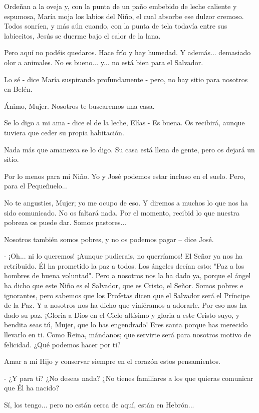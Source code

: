 \documentclass[12pt]{book} %
\begin{document}
Ordeñan a la oveja y, con la punta de un paño embebido de leche caliente y espumosa, María moja los labios del Niño, el cual absorbe ese dulzor cremoso. Todos sonríen, y más aún cuando, con la punta de tela todavía entre sus labiecitos, Jesús se duerme bajo el calor de la lana. 

Pero aquí no podéis quedaros. Hace frío y hay humedad. Y además... demasiado olor a animales. No es bueno... y... no está bien para el Salvador. 

Lo sé - dice María suspirando profundamente - pero, no hay sitio para nosotros en Belén. 

Ánimo, Mujer. Nosotros te buscaremos una casa. 

Se lo digo a mi ama - dice el de la leche, Elías - Es buena. Os recibirá, aunque tuviera que ceder su propia habitación. 

Nada más que amanezca se lo digo. Su casa está llena de gente, pero os dejará un sitio. 

Por lo menos para mi Niño. Yo y José podemos estar incluso en el suelo. Pero, para el Pequeñuelo... 

No te angusties, Mujer; yo me ocupo de eso. Y diremos a muchos lo que nos ha sido comunicado. No os faltará nada. Por el momento, recibid lo que nuestra pobreza os puede dar. Somos pastores... 

Nosotros también somos pobres, y no os podemos pagar – dice José. 

- ¡Oh... ni lo queremos! ¡Aunque pudierais, no querríamos! El Señor ya nos ha retribuido. Él ha prometido la paz a todos. Los ángeles decían esto: "Paz a los hombres de buena voluntad". Pero a nosotros nos la ha dado ya, porque el ángel ha dicho que este Niño es el Salvador, que es Cristo, el Señor. Somos pobres e ignorantes, pero sabemos que los Profetas dicen que el Salvador será el Príncipe de la Paz. Y a nosotros nos ha dicho que viniéramos a adorarle. Por eso nos ha dado su paz. ¡Gloria a Dios en el Cielo altísimo y gloria a este Cristo suyo, y bendita seas tú, Mujer, que lo has engendrado! Eres santa porque has merecido llevarlo en ti. Como Reina, mándanos; que servirte será para nosotros motivo de felicidad. ¿Qué podemos hacer por ti? 

Amar a mi Hijo y conservar siempre en el corazón estos pensamientos. 

- ¿Y para ti? ¿No deseas nada? ¿No tienes familiares a los que quieras comunicar que Él ha nacido? 

Sí, los tengo... pero no están cerca de aquí, están en Hebrón... 
\end{document}
